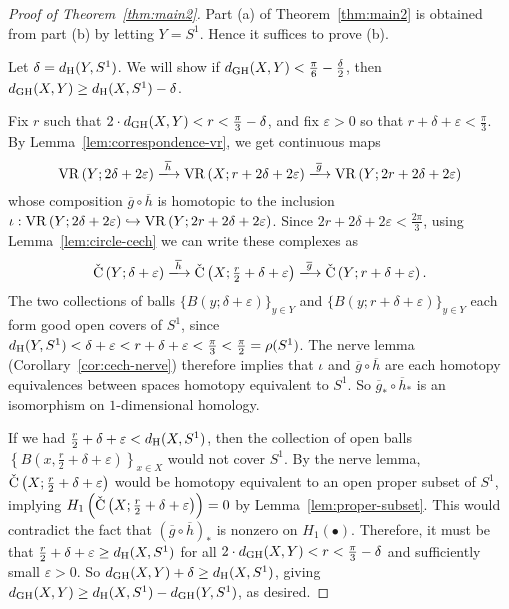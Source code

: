 \documentclass[11pt, reqno, english]{amsart}
\newcommand{\og}{\overline{g}}
\newcommand{\oh}{\overline{h}}
\begin{document}
\vspace{3mm}
\mainTwo*

\begin{proof}[Proof of Theorem~\ref{thm:main2}]
Part (a) of Theorem~\ref{thm:main2} is obtained from part (b) by letting $Y=S^1$.
Hence it suffices to prove (b).

Let $\delta=d_{\mathrm{H}}(Y,S^1)$.
We will show if $d_{\mathrm{GH}}(X,Y)<\frac{\pi}{6}-\frac{\delta}{2}$, then $d_{\mathrm{GH}}(X,Y)\geq d_{\mathrm{H}}(X,S^1)-\delta$.
    
Fix $r$ such that $2\cdot d_{\mathrm{GH}}(X,Y) < r < \frac{\pi}{3}-\delta$, and fix $\varepsilon>0$ so that $r+\delta+\varepsilon < \frac{\pi}{3}$.
By Lemma~\ref{lem:correspondence-vr}, we get continuous maps
\[\vr{Y}{2\delta+2\varepsilon} \xlongrightarrow{\oh} \vr{X}{r+2\delta+2\varepsilon} \xlongrightarrow{\og} \vr{Y}{2r+2\delta+2\varepsilon}\]
whose composition $\og\circ\oh$ is homotopic to the inclusion $\iota:\mathrm{VR}\left(Y;2\delta+2\varepsilon\right)\hookrightarrow\mathrm{VR}\left(Y;2r+2\delta+2\varepsilon\right)$.
Since $2r+2\delta+2\varepsilon < \frac{2\pi}{3}$, using Lemma~\ref{lem:circle-cech} we can write these complexes as
\[\cech{Y}{\delta+\varepsilon} \xlongrightarrow{\oh} \cech{X}{\tfrac{r}{2}+\delta+\varepsilon} \xlongrightarrow{\og} \cech{Y}{r+\delta+\varepsilon}.\]
The two collections of balls $\{B(y;\delta+\varepsilon)\}_{y\in Y}$ and $\{B(y;r+\delta+\varepsilon)\}_{y\in Y}$ each form good open covers of $S^1$, since $d_{\mathrm{H}}(Y,S^1)<\delta+\varepsilon< r+\delta+\varepsilon<\frac{\pi}{3}<\frac{\pi}{2}=\rho(S^1)$.
The nerve lemma (Corollary~\ref{cor:cech-nerve}) therefore implies that $\iota$ and $\og \circ \oh$ are each homotopy equivalences between spaces homotopy equivalent to $S^1$.
So $\og_*\circ\oh_*$ is an isomorphism on $1$-dimensional homology.

If we had $\frac{r}{2}+\delta+\varepsilon<d_{\mathrm{H}}(X,S^1)$, then the collection of open balls $\left\{B\left(x,\frac{r}{2}+\delta+\varepsilon\right)\right\}_{x\in X}$ would not cover $S^1$.
By the nerve lemma, $\mathrm{\check{C}}\left(X;\frac{r}{2}+\delta+\varepsilon\right)$ would be homotopy equivalent to an open proper subset of $S^1$, implying $H_1\left(\mathrm{\check{C}}\left(X;\frac{r}{2}+\delta+\varepsilon\right)\right)=0$ by Lemma~\ref{lem:proper-subset}.
This would contradict the fact that $(\og\circ\oh)_*$ is nonzero on $H_1(\bullet)$.
Therefore, it must be that $\frac{r}{2}+\delta+\varepsilon \ge d_{\mathrm{H}}(X,S^1)$ for all $2\cdot d_{\mathrm{GH}}(X,Y) < r < \frac{\pi}{3}-\delta$ and sufficiently small $\varepsilon>0$.
So $d_{\mathrm{GH}}(X,Y)+\delta \ge d_{\mathrm{H}}(X,S^1)$, giving $d_{\mathrm{GH}}(X,Y) \geq d_{\mathrm{H}}(X,S^1)-d_{\mathrm{GH}}(Y,S^1)$, as desired.
\end{proof}
\end{document}
